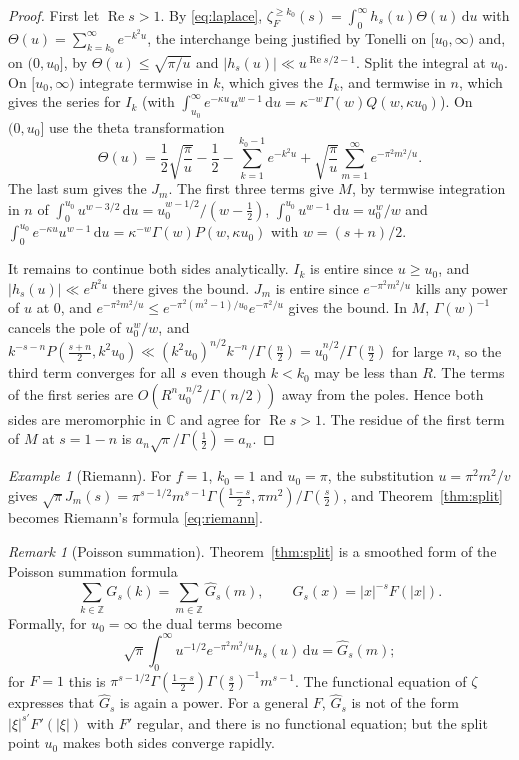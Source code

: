 \documentclass[11pt,reqno]{amsart}
\theoremstyle{definition}
\theoremstyle{remark}
\newtheorem{remark}[theorem]{Remark}
\newtheorem{example}[theorem]{Example}
\newcommand{\dd}{\,\mathrm{d}}
\newcommand{\ZZ}{\mathbb{Z}}
\newcommand{\CC}{\mathbb{C}}
\begin{document}
\begin{proof}
First let $\operatorname{Re}s > 1$. By \eqref{eq:laplace}, $\zeta_F^{\ge k_0}(s) = \int_0^\infty h_s(u)\Theta(u)\dd u$
with $\Theta(u) = \sum_{k=k_0}^{\infty}e^{-k^2u}$, the interchange being justified by Tonelli on $[u_0,\infty)$ and,
on $(0,u_0]$, by $\Theta(u) \le \sqrt{\pi/u}$ and $|h_s(u)| \ll u^{\operatorname{Re}s/2-1}$. Split the integral at $u_0$.
On $[u_0,\infty)$ integrate termwise in $k$, which gives the $I_k$, and termwise in $n$, which gives the series for
$I_k$ (with $\int_{u_0}^\infty e^{-\kappa u}u^{w-1}\dd u = \kappa^{-w}\Gamma(w)Q(w,\kappa u_0)$). On $(0,u_0]$ use the theta
transformation
\[
  \Theta(u) = \frac12\sqrt{\frac\pi u} - \frac12 - \sum_{k=1}^{k_0-1}e^{-k^2u} + \sqrt{\frac\pi u}\sum_{m=1}^{\infty}e^{-\pi^2m^2/u}.
\]
The last sum gives the $J_m$. The first three terms give $M$, by termwise integration in $n$ of
$\int_0^{u_0}u^{w-3/2}\dd u = u_0^{w-1/2}/(w-\frac12)$, $\int_0^{u_0}u^{w-1}\dd u = u_0^w/w$ and
$\int_0^{u_0}e^{-\kappa u}u^{w-1}\dd u = \kappa^{-w}\Gamma(w)P(w,\kappa u_0)$ with $w = (s+n)/2$.

It remains to continue both sides analytically. $I_k$ is entire since $u \ge u_0$, and $|h_s(u)| \ll e^{R^2u}$ there gives the bound.
$J_m$ is entire since $e^{-\pi^2m^2/u}$ kills any power of $u$ at $0$, and
$e^{-\pi^2m^2/u} \le e^{-\pi^2(m^2-1)/u_0}e^{-\pi^2/u}$ gives the bound. In $M$, $\Gamma(w)^{-1}$ cancels the
pole of $u_0^w/w$, and $k^{-s-n}P(\frac{s+n}2,k^2u_0) \ll (k^2u_0)^{n/2}k^{-n}/\Gamma(\frac n2) = u_0^{n/2}/\Gamma(\frac n2)$
for large $n$, so the third term converges for all $s$ even though $k < k_0$ may be less than $R$. The terms of the
first series are $O(R^n u_0^{n/2}/\Gamma(n/2))$ away from the poles. Hence both sides are meromorphic in $\CC$
and agree for $\operatorname{Re}s > 1$. The residue of the first term of $M$ at $s = 1-n$ is
$a_n\sqrt\pi/\Gamma(\frac12) = a_n$.
\end{proof}

\begin{example}[Riemann]\label{ex:riemann}
For $f = 1$, $k_0 = 1$ and $u_0 = \pi$, the substitution $u = \pi^2m^2/v$ gives
$\sqrt\pi J_m(s) = \pi^{s-1/2}m^{s-1}\Gamma(\frac{1-s}2,\pi m^2)/\Gamma(\frac s2)$, and Theorem~\ref{thm:split}
becomes Riemann's formula \eqref{eq:riemann}.
\end{example}

\begin{remark}[Poisson summation]\label{rem:poisson}
Theorem~\ref{thm:split} is a smoothed form of the Poisson summation formula
\[
  \sum_{k\in\ZZ}G_s(k) = \sum_{m\in\ZZ}\widehat G_s(m), \qquad G_s(x) = |x|^{-s}F(|x|).
\]
Formally, for $u_0 = \infty$ the dual terms become
\[
  \sqrt\pi\int_0^\infty u^{-1/2}e^{-\pi^2m^2/u}h_s(u)\dd u = \widehat G_s(m);
\]
for $F = 1$ this is $\pi^{s-1/2}\Gamma(\frac{1-s}{2})\Gamma(\frac s2)^{-1}m^{s-1}$. The functional equation of $\zeta$ expresses that
$\widehat G_s$ is again a power. For a general $F$, $\widehat G_s$ is not of the form $|\xi|^{s'}F'(|\xi|)$ with $F'$
regular, and there is no functional equation; but the split point $u_0$ makes both sides converge rapidly.
\end{remark}
\end{document}
